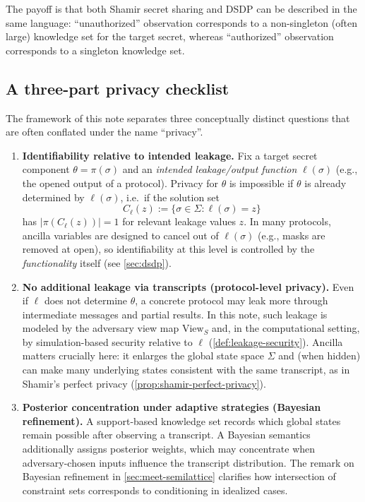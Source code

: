 \documentclass[11pt,a4paper]{article}
\theoremstyle{definition}
\theoremstyle{remark}
\newcommand{\View}{\mathrm{View}}
\begin{document}
The payoff is that both Shamir secret sharing and DSDP can be described in the same language: ``unauthorized'' observation corresponds to a non-singleton (often large) knowledge set for the target secret, whereas ``authorized'' observation corresponds to a singleton knowledge set.

\subsection{A three-part privacy checklist}
\label{sec:privacy-checklist}
The framework of this note separates three conceptually distinct questions that are often conflated under the name ``privacy''.

\begin{enumerate}[leftmargin=2em]
  \item \textbf{Identifiability relative to intended leakage.}
  Fix a target secret component \(\theta=\pi(\sigma)\) and an \emph{intended leakage/output function} \(\ell(\sigma)\) (e.g., the opened output of a protocol).
  Privacy for \(\theta\) is impossible if \(\theta\) is already determined by \(\ell(\sigma)\), i.e.\ if the solution set
  \[
    C_\ell(z) := \{\sigma\in\Sigma : \ell(\sigma)=z\}
  \]
  has \(|\pi(C_\ell(z))|=1\) for relevant leakage values \(z\).
  In many protocols, ancilla variables are designed to cancel out of \(\ell(\sigma)\) (e.g., masks are removed at open), so identifiability at this level is controlled by the \emph{functionality} itself (see \cref{sec:dsdp}).

  \item \textbf{No additional leakage via transcripts (protocol-level privacy).}
  Even if \(\ell\) does not determine \(\theta\), a concrete protocol may leak more through intermediate messages and partial results.
  In this note, such leakage is modeled by the adversary view map \(\View_S\) and, in the computational setting, by simulation-based security relative to \(\ell\) (\cref{def:leakage-security}).
  Ancilla matters crucially here: it enlarges the global state space \(\Sigma\) and (when hidden) can make many underlying states consistent with the same transcript, as in Shamir's perfect privacy (\cref{prop:shamir-perfect-privacy}).

  \item \textbf{Posterior concentration under adaptive strategies (Bayesian refinement).}
  A support-based knowledge set records which global states remain possible after observing a transcript. A Bayesian semantics additionally assigns posterior weights, which may concentrate when adversary-chosen inputs influence the transcript distribution.
  The remark on Bayesian refinement in \cref{sec:meet-semilattice} clarifies how intersection of constraint sets corresponds to conditioning in idealized cases.
\end{enumerate}
\end{document}
